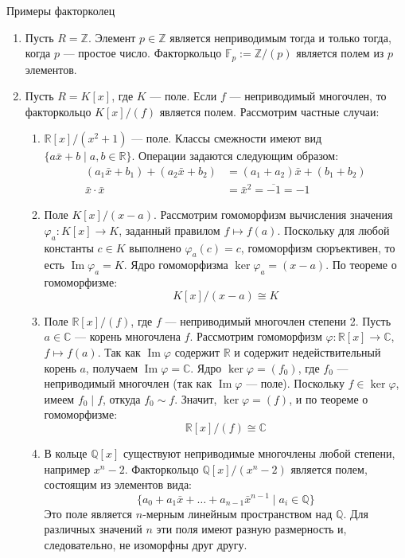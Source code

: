 \begin{Example}{Примеры факторколец}{}
	\begin{enumerate}
		\item Пусть $R = \mathbb{Z}$. Элемент $p \in \mathbb{Z}$ является неприводимым тогда и только тогда, когда $p$ --- простое число. Факторкольцо $\mathbb{F}_p := \mathbb{Z}/(p)$ является полем из $p$ элементов.
		
		\item Пусть $R = K[x]$, где $K$ --- поле. Если $f$ --- неприводимый многочлен, то факторкольцо $K[x]/(f)$ является полем. Рассмотрим частные случаи:
		
		\begin{enumerate}
			\item[(a)] $\mathbb{R}[x]/(x^2+1)$ --- поле. Классы смежности имеют вид $\{a\bar{x} + b \mid a, b \in \mathbb{R}\}$. 
			Операции задаются следующим образом:
			\begin{align*}
				(a_1\bar{x} + b_1) + (a_2\bar{x} + b_2) &= (a_1 + a_2)\bar{x} + (b_1 + b_2) \\
				\bar{x} \cdot \bar{x} &= \bar{x}^2 = \overline{-1} = -1
			\end{align*}
			
			\item[(b)] Поле $K[x]/(x-a)$. Рассмотрим гомоморфизм вычисления значения $\varphi_a\colon K[x] \to K$, заданный правилом $f \mapsto f(a)$.
			Поскольку для любой константы $c \in K$ выполнено $\varphi_a(c) = c$, гомоморфизм сюръективен, то есть $\operatorname{Im}\varphi_a = K$. Ядро гомоморфизма $\ker\varphi_a = (x-a)$. По теореме о гомоморфизме:
			\[ K[x]/(x-a) \cong K \]
			
			\item[(c)] Поле $\mathbb{R}[x]/(f)$, где $f$ --- неприводимый многочлен степени 2. Пусть $a \in \mathbb{C}$ --- корень многочлена $f$. 
			Рассмотрим гомоморфизм $\varphi\colon \mathbb{R}[x] \to \mathbb{C}$, $f \mapsto f(a)$. 
			Так как $\operatorname{Im}\varphi$ содержит $\mathbb{R}$ и содержит недействительный корень $a$, получаем $\operatorname{Im}\varphi = \mathbb{C}$. 
			Ядро $\ker\varphi = (f_0)$, где $f_0$ --- неприводимый многочлен (так как $\operatorname{Im}\varphi$ --- поле). 
			Поскольку $f \in \ker\varphi$, имеем $f_0 \mid f$, откуда $f_0 \sim f$. Значит, $\ker\varphi = (f)$, и по теореме о гомоморфизме:
			\[ \mathbb{R}[x]/(f) \cong \mathbb{C} \]
			
			\item[(d)] В кольце $\mathbb{Q}[x]$ существуют неприводимые многочлены любой степени, например $x^n - 2$.
			Факторкольцо $\mathbb{Q}[x]/(x^n - 2)$ является полем, состоящим из элементов вида:
			\[ \{a_0 + a_1\bar{x} + \dots + a_{n-1}\bar{x}^{n-1} \mid a_i \in \mathbb{Q}\} \]
			Это поле является $n$-мерным линейным пространством над $\mathbb{Q}$. Для различных значений $n$ эти поля имеют разную размерность и, следовательно, не изоморфны друг другу.
			

\end{enumerate}
\end{enumerate}
\end{Example}
